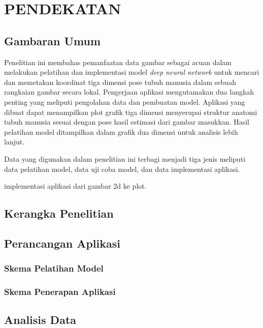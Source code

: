
\chapter{PENDEKATAN}
\label{cha:3-Pendekatan}

\section{Gambaran Umum} \label{sec:3-GambaranUmum}

Penelitian ini membahas pemanfaatan data gambar sebagai acuan dalam melakukan pelatihan dan
implementasi model \textit{deep neural network} untuk mencari dan memetakan koordinat tiga dimensi
pose tubuh manusia dalam sebuah rangkaian gambar secara lokal. Pengerjaan aplikasi mengutamakan dua
langkah penting yang meliputi pengolahan data dan pembuatan model. Aplikasi yang dibuat dapat menampilkan
plot grafik tiga dimensi menyerupai struktur anatomi tubuh manusia sesuai dengan pose hasil
estimasi dari gambar masukkan. Hasil pelatihan model ditampilkan dalam grafik dua dimensi untuk
analisis lebih lanjut.

Data yang digunakan dalam penelitian ini terbagi menjadi tiga jenis meliputi data pelatihan model,
data uji coba model, dan data implementasi aplikasi.

implementasi aplikasi dari gambar 2d ke plot.

\section{Kerangka Penelitian} \label{sec:3-KerangkaPenelitian}

\section{Perancangan Aplikasi} \label{sec:3-PerancanganAplikasi}

\subsection{Skema Pelatihan Model}

\subsection{Skema Penerapan Aplikasi}

\section{Analisis Data} \label{sec:3-AnalisisData}

